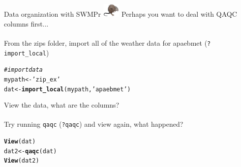 \documentclass[xcolor=dvipsnames]{beamer}\usepackage[]{graphicx}\usepackage[]{color}
\makeatletter
\newcommand{\hlstr}[1]{\textcolor[rgb]{0.192,0.494,0.8}{#1}}%
\newcommand{\hlcom}[1]{\textcolor[rgb]{0.678,0.584,0.686}{\textit{#1}}}%
\newcommand{\hlstd}[1]{\textcolor[rgb]{0.345,0.345,0.345}{#1}}%
\newcommand{\hlkwb}[1]{\textcolor[rgb]{0.69,0.353,0.396}{#1}}%
\newcommand{\hlkwd}[1]{\textcolor[rgb]{0.737,0.353,0.396}{\textbf{#1}}}%
\newenvironment{kframe}{%
 \def\at@end@of@kframe{}%
 \ifinner\ifhmode%
  \def\at@end@of@kframe{\end{minipage}}%
  \begin{minipage}{\columnwidth}%
 \fi\fi%
 \def\FrameCommand##1{\hskip\@totalleftmargin \hskip-\fboxsep
 \colorbox{shadecolor}{##1}\hskip-\fboxsep
     \hskip-\linewidth \hskip-\@totalleftmargin \hskip\columnwidth}%
 \MakeFramed {\advance\hsize-\width
   \@totalleftmargin\z@ \linewidth\hsize
   \@setminipage}}%
 {\par\unskip\endMakeFramed%
 \at@end@of@kframe}
\newenvironment{knitrout}{}{} %
\makeatother
\begin{document}
\begin{frame}[fragile]{Data organization with SWMPr \includegraphics[width = 0.065\textwidth]{imgs/swmprat.png}}
\onslide<+->
Perhaps you want to deal with QAQC columns first... \\~\\
From the zips folder, import all of the weather data for apaebmet (\texttt{?import\_local})
\onslide<+->
\begin{knitrout}\scriptsize
{}\color{fgcolor}\begin{kframe}
\begin{alltt}
\hlcom{# import data }
\hlstd{mypath} \hlkwb{<-} \hlstr{'zip_ex'}
\hlstd{dat} \hlkwb{<-} \hlkwd{import_local}\hlstd{(mypath,} \hlstr{'apaebmet'}\hlstd{)}
\end{alltt}
\end{kframe}
\end{knitrout}
\onslide<+->
View the data, what are the columns? \\~\\
Try running \texttt{qaqc} (\texttt{?qaqc}) and view again, what happened?
\onslide<+->
\begin{knitrout}\scriptsize
{}\color{fgcolor}\begin{kframe}
\begin{alltt}
\hlkwd{View}\hlstd{(dat)}
\hlstd{dat2} \hlkwb{<-} \hlkwd{qaqc}\hlstd{(dat)}
\hlkwd{View}\hlstd{(dat2)}
\end{alltt}
\end{kframe}
\end{knitrout}
\end{frame}
\end{document}
